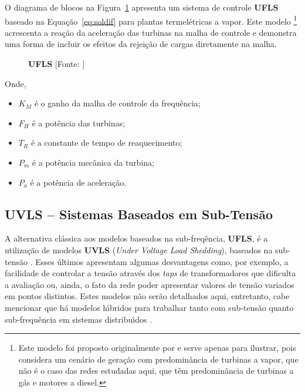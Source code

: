 O diagrama de blocos na Figura~\ref{fig:diag3} apresenta um sistema de controle \textbf{UFLS} baseado na Equa{\c c}{\~a}o~\ref{eq:soldif} para plantas termel{\'e}tricas a vapor. Este modelo \footnote{Este modelo foi proposto originalmente por \citeauthor{65898} e serve apenas para ilustrar, pois considera um cen{\'a}rio de gera{\c c}{\~a}o com predomin{\^a}ncia de turbinas a vapor, que n{\~a}o {\'e} o caso das redes estudadas aqui, que t{\^e}m predomin{\^a}ncia de turbinas a g{\'a}s e motores a diesel.} acrescenta a rea{\c c}{\~a}o da acelera{\c c}{\~a}o das turbinas na malha de controle e demonstra uma forma de incluir os efeitos da rejei{\c c}{\~a}o de cargas diretamente na malha.

\begin{figure}[!h]
	\centering
	\begin{Large}
	\end{Large}
	\caption[\textbf{UFLS}]{\textbf{UFLS} [Fonte: ]}
	\label{fig:diag3}
\end{figure}

Onde,

\begin{itemize}
	\item[] $K_{M}$ {\'e} o ganho da malha de controle da frequ{\^e}ncia;
	\item[] $F_{H}$ {\'e} a pot{\^e}ncia das turbinas;
	\item[] $T_{R}$ {\'e} a constante de tempo de reaquecimento;
	\item[] $P_{m}$ {\'e} a pot{\^e}ncia mec{\^a}nica da turbina;
	\item[] $P_{a}$ {\'e} a pot{\^e}ncia de acelera{\c c}{\~a}o.
\end{itemize}

\subsection{\textbf{UVLS} \--- Sistemas Baseados em Sub-Tens{\~a}o} \label{ssec:uvls}

A alternativa cl{\'a}ssica aos modelos baseados na sub-freq{\^e}ncia, \textbf{UFLS}, {\'e} a utiliza{\c c}{\~a}o de modelos \textbf{UVLS} (\textit{Under Voltage Load Shedding}), baseados na sub-tens{\~a}o \cite{laghari2014}. Esses {\'u}ltimos apresentam algumas desvantagens como, por exemplo, a facilidade de controlar a tens{\~a}o atrav{\'e}s dos \textit{taps} de transformadores que dificulta a avalia{\c c}{\~a}o ou, ainda, o fato da rede poder apresentar valores de tens{\~a}o variados em pontos distintos. Estes modelos n{\~a}o ser{\~a}o detalhados aqui, entretanto, cabe mencionar que h{\'a} modelos h{\'\i}bridos para trabalhar tanto com sub-tens{\~a}o quanto sub-frequ{\^e}ncia em sistemas distribu{\'\i}dos \cite{ye2015, qing2016}.


